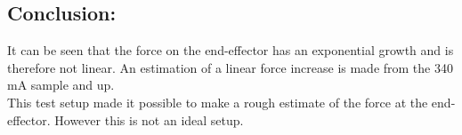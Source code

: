\subsection*{Conclusion:}
It can be seen that the force on the end-effector has an exponential growth and is therefore not linear.
An estimation of a linear force increase is made from the 340 mA sample and up.\\
This test setup made it possible to make a rough estimate of the force at the end-effector. However this is not an ideal setup.

